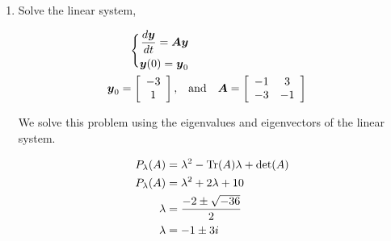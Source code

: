\documentclass{article}
\begin{document}
\begin{enumerate}[label=\alph*)]

    \item Solve the linear system,

        \begin{align}
             \Biggl\{\begin{split}
                \frac{d\boldsymbol{y}}{dt} = \boldsymbol{Ay} \\ \boldsymbol{y}(0) = \boldsymbol{y}_0
            \end{split} \\
            \boldsymbol{y}_0 = \left[\begin{array}{c}-3 \\ 1\end{array}\right], \quad &\text{and} \quad \boldsymbol{A} = \left[\begin{array}{c c}-1 & 3 \\ -3 & -1 \end{array}\right]
        \end{align}

        We solve this problem using the eigenvalues and eigenvectors of the linear system. 

        \begin{align}
            P_{\lambda}(A) &= \lambda^2 - \text{Tr}(A)\lambda + \det(A) \\
            P_{\lambda}(A) &= \lambda^2 +2\lambda + 10 \\
            \lambda &= \frac{-2 \pm \sqrt{-36}}{2} \\
            \lambda &= -1 \pm 3i
        \end{align}


\end{enumerate}
\end{document}
